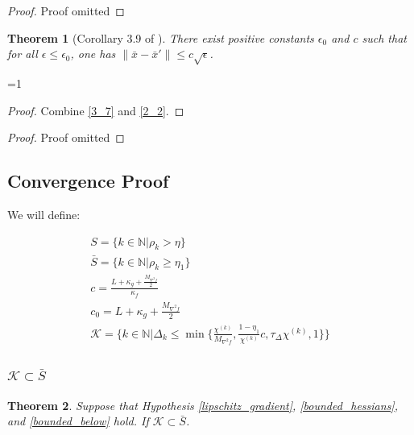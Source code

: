 \documentclass{article}
\newtheorem{theorem}{Theorem}[section]
\theoremstyle{case}
\newcommand{\dk}{\Delta_k}
\newcommand{\chik}{{\chi^{(k)}}}
\newcommand{\ints}{\mathbb N} %
\newcommand{\rk}{\rho_k}
\newcommand{\oalpha}{\tau_{\Delta}}
\newcommand{\xo}{{{\bar x}}}
\newcommand{\hfb}{{M_{\nabla^2 f}}}
\def\includeproofs{1}
\begin{document}
\else
\begin{proof}
Proof omitted
\end{proof}
\fi


\begin{theorem}[Corollary 3.9 of \cite{dummy:continuity}]
\label{3_9}
There exist positive constants $\epsilon_0$ and $c$ such that for all $\epsilon \le \epsilon_0$,  one has $\|\xo - \xo'\| \le c \sqrt{\epsilon}$.
\end{theorem}

\ifnum\includeproofs=1
\begin{proof}
Combine \cref{3_7} and \cref{2_2}.
\end{proof}
\else
\begin{proof}
Proof omitted
\end{proof}
\fi



\subsection{Convergence Proof}



We will define:

\begin{align*}
S = \{k \in \ints | \rk > \eta \} \\
\bar{S} = \{k \in \ints | \rk \ge \eta_1 \} \\
c = \frac{L + \kappa_{g} + \frac {\hfb} 2}{\kappa_f} \\
c_0 = L + \kappa_{g} + \frac {\hfb} 2 \\
\mathcal K = \big \{ k \in \ints | \dk \le \min \{ \frac {\chik}{\hfb}, \frac{1-\eta_1}{\chik}c, \oalpha \chik, 1 \} \big \}
\end{align*}



\subsubsection{$\mathcal K \subset \bar{S}$}
\begin{theorem}
Suppose that Hypothesis \cref{lipschitz_gradient},  \cref{bounded_hessians}, and \cref{bounded_below} hold. If $\mathcal K \subset \bar{S}$.
\end{theorem}
 
\end{document}
